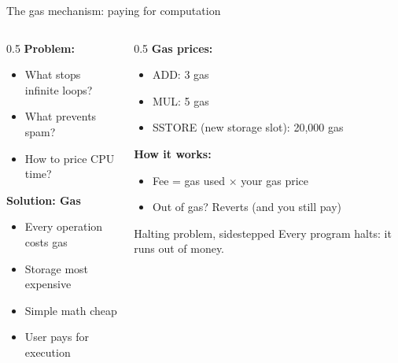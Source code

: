 \ifdefined\PRESENTATION\else\PassOptionsToClass{handout}{beamer}\fi\documentclass[aspectratio=169, lualatex]{beamer}
\begin{document}
\begin{frame}{The gas mechanism: paying for computation}
	\begin{columns}[c]
		\begin{column}{0.5\textwidth}
			\textbf{Problem:}
			\begin{itemize}
				\item What stops infinite loops?
				\item What prevents spam?
				\item How to price CPU time?
			\end{itemize}
			\textbf{Solution: Gas}
			\begin{itemize}
				\item Every operation costs gas
				\item Storage most expensive
				\item Simple math cheap
				\item User pays for execution
			\end{itemize}
		\end{column}
		\begin{column}{0.5\textwidth}
			\textbf{Gas prices:}
			\begin{itemize}
				\item ADD: 3 gas
				\item MUL: 5 gas
				\item SSTORE (new storage slot): 20,000 gas
			\end{itemize}
			\textbf{How it works:}
			\begin{itemize}
				\item Fee = gas used $\times$ your gas price
				\item Out of gas? Reverts (and you still pay)
			\end{itemize}
			\begin{exampleblock}{Halting problem, sidestepped}
				Every program halts: it runs out of money.
			\end{exampleblock}
		\end{column}
	\end{columns}
\end{frame}
\end{document}
